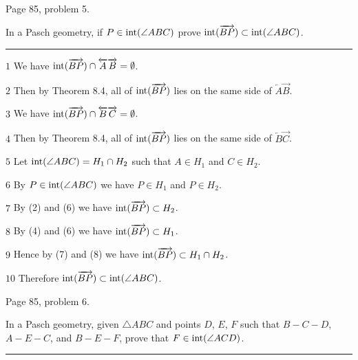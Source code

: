 \vfill
\eject

\beginsection Page 85, problem 5.

In a Pasch geometry, if $P\in \mathop{\rm int}\nolimits(\angle ABC)$ prove
$\mathop{\rm int}\nolimits(\overrightarrow{BP})\subset \mathop{\rm int}\nolimits(\angle ABC)$.

\medskip
\hrule

\bigskip
\item{$\scriptstyle1$}
We have $\mathop{\rm int}\nolimits(\overrightarrow{BP})\cap\overleftarrow A\overrightarrow B=\emptyset$.

\medskip
\item{$\scriptstyle2$}
Then by Theorem 8.4, all of $\mathop{\rm int}\nolimits(\overrightarrow{BP})$ lies on the same side of
$\overleftarrow A\overrightarrow B$.

\medskip
\item{$\scriptstyle3$}
We have $\mathop{\rm int}\nolimits(\overrightarrow{BP})\cap\overleftarrow B\overrightarrow C=\emptyset$.

\medskip
\item{$\scriptstyle4$}
Then by Theorem 8.4, all of $\mathop{\rm int}\nolimits(\overrightarrow{BP})$ lies on the same side of
$\overleftarrow B\overrightarrow C$.

\medskip
\item{$\scriptstyle5$}
Let $\mathop{\rm int}\nolimits(\angle ABC)=H_1\cap H_2$ such that $A\in H_1$ and $C\in H_2$.

\medskip
\item{$\scriptstyle6$}
By $P\in \mathop{\rm int}\nolimits(\angle ABC)$ we have $P\in H_1$ and $P\in H_2$.

\medskip
\item{$\scriptstyle7$}
By (2) and (6) we have
$\mathop{\rm int}\nolimits(\overrightarrow{BP})\subset H_2$.

\medskip
\item{$\scriptstyle8$}
By (4) and (6) we have
$\mathop{\rm int}\nolimits(\overrightarrow{BP})\subset H_1$.

\medskip
\item{$\scriptstyle9$}
Hence by (7) and (8) we have $\mathop{\rm int}\nolimits(\overrightarrow{BP})\subset H_1\cap H_2$.

\medskip
\item{$\scriptstyle10$}
Therefore
$\mathop{\rm int}\nolimits(\overrightarrow{BP})\subset \mathop{\rm int}\nolimits(\angle ABC)$.

\vfill
\eject

\beginsection Page 85, problem 6.

In a Pasch geometry, given $\triangle ABC$ and points $D$, $E$, $F$
such that $B{-}C{-}D$, $A{-}E{-}C$, and $B{-}E{-}F$,
prove that $F\in \mathop{\rm int}\nolimits(\angle ACD)$.

\medskip
\hrule

